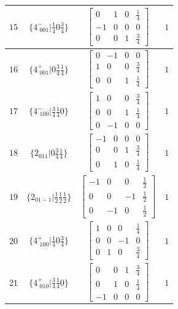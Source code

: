 \documentclass[fleqn,8pt]{jsarticle}
\begin{document}
\begin{longtable}{cccc}
$ 15 $ & $ \{4^{-}_{\,\,001}|\frac{1}{4} 0 \frac{3}{4}\} $ & $ \begin{bmatrix} 0 & 1 & 0 & \frac{1}{4} \\ -1 & 0 & 0 & 0 \\ 0 & 0 & 1 & \frac{3}{4} \end{bmatrix} $ & $ 1 $ \\ \hline
$ 16 $ & $ \{4^{+}_{\,\,001}|0 \frac{3}{4} \frac{1}{4}\} $ & $ \begin{bmatrix} 0 & -1 & 0 & 0 \\ 1 & 0 & 0 & \frac{3}{4} \\ 0 & 0 & 1 & \frac{1}{4} \end{bmatrix} $ & $ 1 $ \\ \hline
$ 17 $ & $ \{4^{-}_{\,\,100}|\frac{3}{4} \frac{1}{4} 0\} $ & $ \begin{bmatrix} 1 & 0 & 0 & \frac{3}{4} \\ 0 & 0 & 1 & \frac{1}{4} \\ 0 & -1 & 0 & 0 \end{bmatrix} $ & $ 1 $ \\ \hline
$ 18 $ & $ \{2{}_{011}|0 \frac{3}{4} \frac{1}{4}\} $ & $ \begin{bmatrix} -1 & 0 & 0 & 0 \\ 0 & 0 & 1 & \frac{3}{4} \\ 0 & 1 & 0 & \frac{1}{4} \end{bmatrix} $ & $ 1 $ \\ \hline
$ 19 $ & $ \{2{}_{01-1}|\frac{1}{2} \frac{1}{2} \frac{1}{2}\} $ & $ \begin{bmatrix} -1 & 0 & 0 & \frac{1}{2} \\ 0 & 0 & -1 & \frac{1}{2} \\ 0 & -1 & 0 & \frac{1}{2} \end{bmatrix} $ & $ 1 $ \\ \hline
$ 20 $ & $ \{4^{+}_{\,\,100}|\frac{1}{4} 0 \frac{3}{4}\} $ & $ \begin{bmatrix} 1 & 0 & 0 & \frac{1}{4} \\ 0 & 0 & -1 & 0 \\ 0 & 1 & 0 & \frac{3}{4} \end{bmatrix} $ & $ 1 $ \\ \hline
$ 21 $ & $ \{4^{+}_{\,\,010}|\frac{3}{4} \frac{1}{4} 0\} $ & $ \begin{bmatrix} 0 & 0 & 1 & \frac{3}{4} \\ 0 & 1 & 0 & \frac{1}{4} \\ -1 & 0 & 0 & 0 \end{bmatrix} $ & $ 1 $ \\ \hline

\end{longtable}
\end{document}
